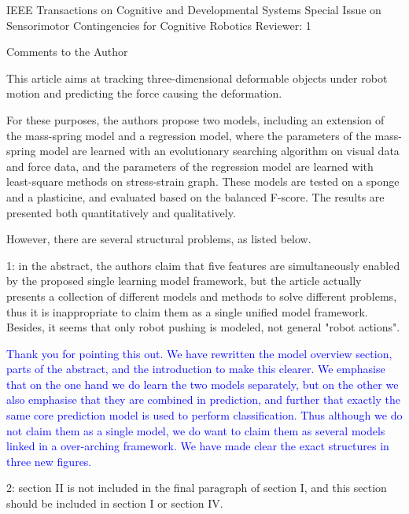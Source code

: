 \documentclass[a4paper,12pt]{letter}
\newcommand{\comment}[1]{\textcolor{blue}{#1}}
\newcommand{\marker}{\hspace*{-1.6em}\textcolor{red}{$\Longrightarrow$}}
\begin{document}
\begin{letter}{IEEE Transactions on Cognitive and Developmental Systems\newline
Special Issue on Sensorimotor Contingencies for Cognitive Robotics}
Reviewer: 1 

Comments to the Author 

This article aims at tracking three-dimensional deformable objects under robot motion and predicting the force causing the deformation.

%

For these purposes, the authors propose two models, including an extension of the mass-spring model and a regression model, where the parameters of the mass-spring model are learned with an evolutionary searching algorithm on visual data and force data, and the parameters of the regression model are learned with least-square methods on stress-strain graph. These models are tested on a sponge and a plasticine, and evaluated based on the balanced F-score. The results are presented both quantitatively and qualitatively. 

However, there are several structural problems, as listed below. 

1: in the abstract, the authors claim that five features are simultaneously enabled by the proposed single learning model framework, but the article actually presents a collection of different models and methods to solve different problems, thus it is inappropriate to claim them as a single unified model framework. Besides, it seems that only robot pushing is modeled, not general "robot actions". 

\comment{Thank you for pointing this out. We have rewritten the model overview section, parts of the abstract, and the introduction to make this clearer. We emphasise that on the one hand we do learn the two models separately, but on the other we also emphasise that they are combined in prediction, and further that exactly the same core prediction model is used to perform classification. Thus although we do not claim them as a single model, we do want to claim them as several models linked in a over-arching framework. We have made clear the exact structures in three new figures.}

2: section II is not included in the final paragraph of section I, and this section should be included in section I or section IV.


\end{letter}
\end{document}
